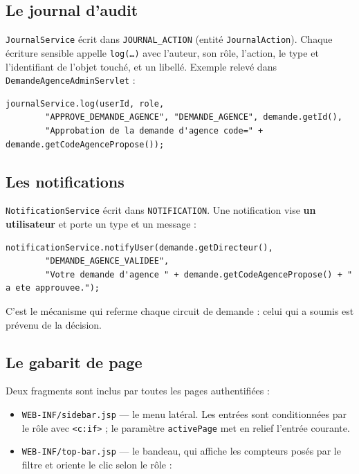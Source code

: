 \subsection{Le journal d'audit}

\texttt{JournalService} écrit dans \texttt{JOURNAL\_ACTION} (entité
\texttt{JournalAction}). Chaque écriture sensible appelle \texttt{log(\dots)}
avec l'auteur, son rôle, l'action, le type et l'identifiant de l'objet touché,
et un libellé. Exemple relevé dans \texttt{DemandeAgenceAdminServlet} :

\begin{lstlisting}[style=java]
journalService.log(userId, role,
        "APPROVE_DEMANDE_AGENCE", "DEMANDE_AGENCE", demande.getId(),
        "Approbation de la demande d'agence code=" + demande.getCodeAgencePropose());
\end{lstlisting}

\subsection{Les notifications}

\texttt{NotificationService} écrit dans \texttt{NOTIFICATION}. Une notification
vise \textbf{un utilisateur} et porte un type et un message :

\begin{lstlisting}[style=java]
notificationService.notifyUser(demande.getDirecteur(),
        "DEMANDE_AGENCE_VALIDEE",
        "Votre demande d'agence " + demande.getCodeAgencePropose() + " a ete approuvee.");
\end{lstlisting}

C'est le mécanisme qui referme chaque circuit de demande : celui qui a soumis
est prévenu de la décision.

\subsection{Le gabarit de page}

Deux fragments sont inclus par toutes les pages authentifiées :

\begin{itemize}[leftmargin=*,itemsep=1pt]
  \item \texttt{WEB-INF/sidebar.jsp} --- le menu latéral. Les entrées sont
        conditionnées par le rôle avec \texttt{<c:if>} ; le paramètre
        \texttt{activePage} met en relief l'entrée courante.
  \item \texttt{WEB-INF/top-bar.jsp} --- le bandeau, qui affiche les compteurs
        posés par le filtre et oriente le clic selon le rôle :
\end{itemize}

